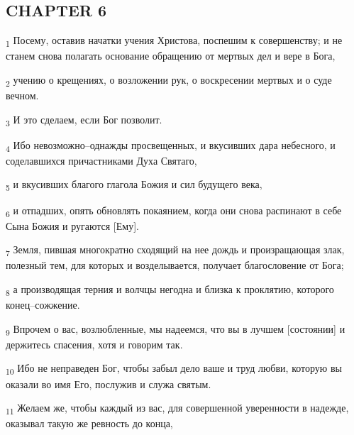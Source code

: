 \subsection{CHAPTER 6}
\begin{tcolorbox}
\textsubscript{1} Посему, оставив начатки учения Христова, поспешим к совершенству; и не станем снова полагать основание обращению от мертвых дел и вере в Бога,
\end{tcolorbox}
\begin{tcolorbox}
\textsubscript{2} учению о крещениях, о возложении рук, о воскресении мертвых и о суде вечном.
\end{tcolorbox}
\begin{tcolorbox}
\textsubscript{3} И это сделаем, если Бог позволит.
\end{tcolorbox}
\begin{tcolorbox}
\textsubscript{4} Ибо невозможно--однажды просвещенных, и вкусивших дара небесного, и соделавшихся причастниками Духа Святаго,
\end{tcolorbox}
\begin{tcolorbox}
\textsubscript{5} и вкусивших благого глагола Божия и сил будущего века,
\end{tcolorbox}
\begin{tcolorbox}
\textsubscript{6} и отпадших, опять обновлять покаянием, когда они снова распинают в себе Сына Божия и ругаются [Ему].
\end{tcolorbox}
\begin{tcolorbox}
\textsubscript{7} Земля, пившая многократно сходящий на нее дождь и произращающая злак, полезный тем, для которых и возделывается, получает благословение от Бога;
\end{tcolorbox}
\begin{tcolorbox}
\textsubscript{8} а производящая терния и волчцы негодна и близка к проклятию, которого конец--сожжение.
\end{tcolorbox}
\begin{tcolorbox}
\textsubscript{9} Впрочем о вас, возлюбленные, мы надеемся, что вы в лучшем [состоянии] и держитесь спасения, хотя и говорим так.
\end{tcolorbox}
\begin{tcolorbox}
\textsubscript{10} Ибо не неправеден Бог, чтобы забыл дело ваше и труд любви, которую вы оказали во имя Его, послужив и служа святым.
\end{tcolorbox}
\begin{tcolorbox}
\textsubscript{11} Желаем же, чтобы каждый из вас, для совершенной уверенности в надежде, оказывал такую же ревность до конца,
\end{tcolorbox}
